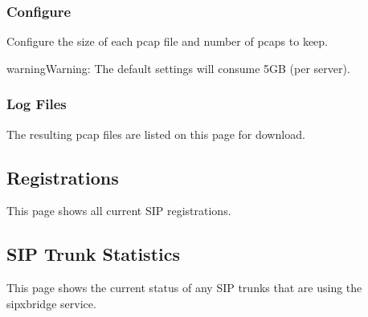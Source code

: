 \documentclass[letterpaper,10pt,english]{sphinxmanual}
\begin{document}
\subsubsection{Configure}
\label{\detokenize{webui:configure}}
Configure the size of each pcap file and number of pcaps to keep.
\begin{quote}

\end{quote}

\begin{sphinxadmonition}{warning}{Warning:}
 The default settings will consume 5GB (per server).
\end{sphinxadmonition}


\subsubsection{Log Files}
\label{\detokenize{webui:log-files}}
The resulting pcap files are listed on this page for download.
\begin{quote}

\end{quote}


\subsection{Registrations}
\label{\detokenize{webui:registrations}}\label{\detokenize{webui:diagnostics-registrations}}
This page shows all current SIP registrations.
\begin{quote}

\end{quote}


\subsection{SIP Trunk Statistics}
\label{\detokenize{webui:sip-trunk-statistics}}\label{\detokenize{webui:diagnostics-sip-trunk-status}}
This page shows the current status of any SIP trunks that are using the sipxbridge service.
\begin{quote}

\end{quote}
\end{document}

